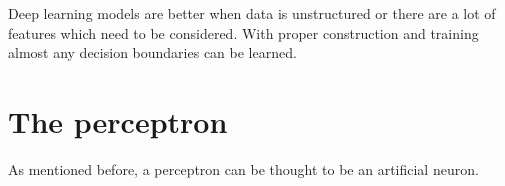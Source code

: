 Deep learning models are better when data is unstructured or there are a lot of features which
need to be considered. With proper construction and training almost any decision boundaries
can be learned.
\section{The perceptron}
As mentioned before, a perceptron can be thought to be an artificial neuron. 